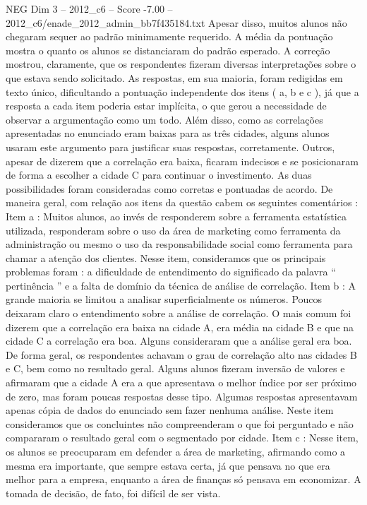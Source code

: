 \begin{textsample}{NEG Dim 3 – 2012\_c6 – Score -7.00 – 2012\_c6/enade\_2012\_admin\_bb7f435184.txt}
Apesar disso, muitos alunos não chegaram sequer ao padrão minimamente requerido.
A média da pontuação mostra o quanto os alunos se distanciaram do padrão esperado.
A correção mostrou, claramente, que os respondentes fizeram diversas interpretações sobre o que estava sendo solicitado.
As respostas, em sua maioria, foram redigidas em texto único, dificultando a pontuação independente dos itens ( a, b e c ), já que a resposta a cada item poderia estar implícita, o que gerou a necessidade de observar a argumentação como um todo.
Além disso, como as correlações apresentadas no enunciado eram baixas para as três cidades, alguns alunos usaram este argumento para justificar suas respostas, corretamente.
Outros, apesar de dizerem que a correlação era baixa, ficaram indecisos e se posicionaram de forma a escolher a cidade C para continuar o investimento.
As duas possibilidades foram consideradas como corretas e pontuadas de acordo.
De maneira geral, com relação aos itens da questão cabem os seguintes comentários : Item a : Muitos alunos, ao invés de responderem sobre a ferramenta estatística utilizada, responderam sobre o uso da área de marketing como ferramenta da administração ou mesmo o uso da responsabilidade social como ferramenta para chamar a atenção dos clientes.
Nesse item, consideramos que os principais problemas foram : a dificuldade de entendimento do significado da palavra “ pertinência ” e a falta de domínio da técnica de análise de correlação.
Item b : A grande maioria se limitou a analisar superficialmente os números.
Poucos deixaram claro o entendimento sobre a análise de correlação.
O mais comum foi dizerem que a correlação era baixa na cidade A, era média na cidade B e que na cidade C a correlação era boa.
Alguns consideraram que a análise geral era boa.
De forma geral, os respondentes achavam o grau de correlação alto nas cidades B e C, bem como no resultado geral.
Alguns alunos fizeram inversão de valores e afirmaram que a cidade A era a que apresentava o melhor índice por ser próximo de zero, mas foram poucas respostas desse tipo.
Algumas respostas apresentavam apenas cópia de dados do enunciado sem fazer nenhuma análise.
Neste item consideramos que os concluintes não compreenderam o que foi perguntado e não compararam o resultado geral com o segmentado por cidade.
Item c : Nesse item, os alunos se preocuparam em defender a área de marketing, afirmando como a mesma era importante, que sempre estava certa, já que pensava no que era melhor para a empresa, enquanto a área de finanças só pensava em economizar.
A tomada de decisão, de fato, foi difícil de ser vista.

\end{textsample}
